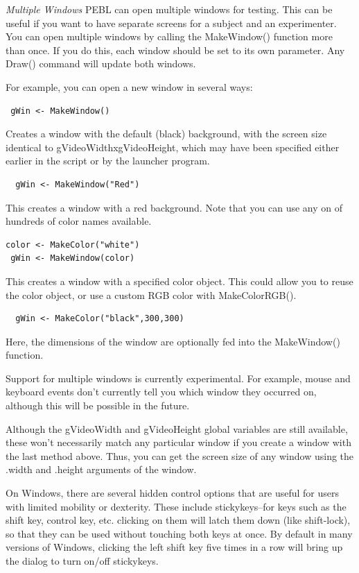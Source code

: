 \emph{Multiple Windows}
PEBL can open multiple windows for testing.  This can be useful if you want to have separate screens for a subject and an experimenter.  You can open multiple windows by calling the MakeWindow() function more than once.  If you do this, each window should be set to its own parameter.  Any Draw() command will update both windows.


For example, you can open a new window in several ways:

\begin{verbatim}
 gWin <- MakeWindow()
\end{verbatim}
Creates a window with the default (black) background, with the screen size identical to gVideoWidthxgVideoHeight, which may have been specified either earlier in the script or by the launcher program.

\begin{verbatim}
  gWin <- MakeWindow("Red")
\end{verbatim}
This creates a window with a red background.  Note that you can use any on of hundreds of color names available.


\begin{verbatim}
color <- MakeColor("white")
 gWin <- MakeWindow(color)
\end{verbatim}
This creates a window with a specified color object.  This could allow you to reuse the color object, or use a custom RGB color with MakeColorRGB().


\begin{verbatim}
  gWin <- MakeColor("black",300,300)
\end{verbatim}
Here, the dimensions of the window are optionally fed into the MakeWindow() function.


Support for multiple windows is currently experimental.  For example, mouse and keyboard events don't currently tell you which window they occurred on, although this will be possible in the future.
   

Although the gVideoWidth and gVideoHeight global variables are still available, these won't necessarily match any particular window if you create a window with the last method above.  Thus, you can get the screen size of any window using the .width and .height arguments of the window.



On Windows, there are several hidden control options that are useful for users with limited mobility or dexterity.  These include stickykeys--for keys such as the shift key, control key, etc. clicking on them will latch them down (like shift-lock), so that they can be used without touching both keys at once.  By default in many versions of Windows, clicking the left shift key five times in a row will bring up the dialog to turn on/off stickykeys.

